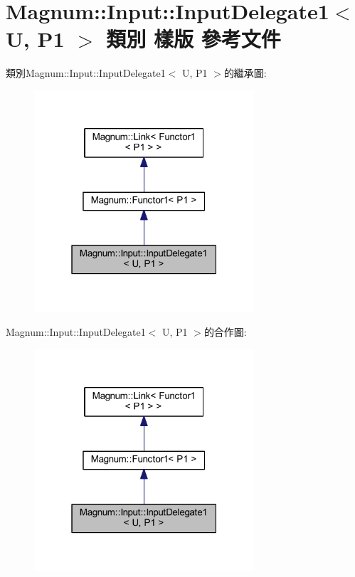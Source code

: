 \hypertarget{class_magnum_1_1_input_1_1_input_delegate1}{}\section{Magnum\+:\+:Input\+:\+:Input\+Delegate1$<$ U, P1 $>$ 類別 樣版 參考文件}
\label{class_magnum_1_1_input_1_1_input_delegate1}


類別\+Magnum\+:\+:Input\+:\+:Input\+Delegate1$<$ U, P1 $>$的繼承圖\+:\nopagebreak
\begin{figure}[H]
\begin{center}
\leavevmode
\includegraphics[width=232pt]{class_magnum_1_1_input_1_1_input_delegate1__inherit__graph}
\end{center}
\end{figure}


Magnum\+:\+:Input\+:\+:Input\+Delegate1$<$ U, P1 $>$的合作圖\+:\nopagebreak
\begin{figure}[H]
\begin{center}
\leavevmode
\includegraphics[width=232pt]{class_magnum_1_1_input_1_1_input_delegate1__coll__graph}
\end{center}
\end{figure}
